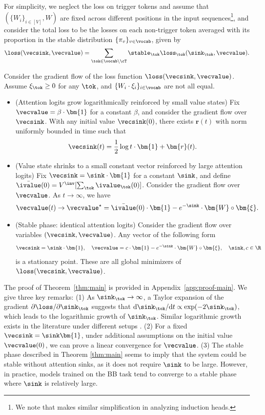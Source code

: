 For simplicity, we neglect the loss on trigger tokens and assume that $(\{ W_i \}_{i \in [V]}, W)$ are fixed across different positions in the input sequences\footnote{We note that \cite{reddy2023mechanistic} makes similar simplification in analyzing induction heads.}, and consider the total loss to be the losses on each non-trigger token averaged with its proportion in the stable distribution $\{\pi_v\}_{v \in \vocab}$, given by
\[
\loss(\vecsink,\vecvalue) = \sum_{\tok \in \vocab \setminus \cT} \stable_\tok \loss_\tok(\sink_\tok, \vecvalue).
\]
\begin{theorem}\label{thm:main}
Consider the gradient flow of the loss function $\loss(\vecsink, \vecvalue)$. Assume $\xi_\tok \ge 0$ for any $\tok$, and $\{ W_i \cdot \xi_i \}_{i \in \vocab}$ are not all equal. 
\begin{itemize}[leftmargin=2em]
\setlength\itemsep{0pt}
    \item (Attention logits grow logarithmically reinforced by small value states) Fix $\vecvalue= \beta \cdot \bm{1}$ for a constant $\beta$, and consider the gradient flow over $\vecsink$. With any initial value $\vecsink(0)$, there exists $\bm{r}(t)$ with norm uniformly bounded in time such that 
    \[\vecsink(t) = \frac{1}{2} \log t \cdot \bm{1} + \bm{r}(t).\]
    \item (Value state shrinks to a small constant vector reinforced by large attention logits) Fix $\vecsink = \sink \cdot \bm{1}$ for a constant $\sink$, and define $\bar{\ivalue}(0) = V^\inv[\sum_{\tok} \ivalue_\tok(0)]$. Consider the gradient flow over $\vecvalue$. As $t \to \infty$, we have
    \[\vecvalue(t) \to \vecvalue^\star = \bar\ivalue(0) \cdot \bm{1} - e^{-\sink} \cdot \bm{W}\circ \bm{\xi}.\]
    \item (Stable phase: identical attention logits) Consider the gradient flow over variables $(\vecsink, \vecvalue)$. Any vector of the following form
    \[\vecsink = \sink \cdot \bm{1}, \quad \vecvalue = c \cdot \bm{1} - e^{-\sink} \cdot \bm{W} \circ \bm{\xi},  ~~~ \sink, c\in\R \]
     is a stationary point. These are all global minimizers of $\loss(\vecsink,\vecvalue)$.
\end{itemize}
\end{theorem}
The proof of Theorem~\ref{thm:main} is provided in Appendix~\ref{app:proof-main}. We give three key remarks: (1) As $\sink_\tok\to\infty$, a Taylor expansion of the gradient $\partial \loss/\partial \sink_\tok$ suggests that $\mathrm{d}\sink_\tok/\mathrm{d}t \propto \exp(-2 \sink_\tok)$, which leads to the logarithmic growth of $\sink_\tok$. Similar logarithmic growth exists in the literature under different setups \citep{tian2023scan,han2023lm}. (2) For a fixed $\vecsink=\sink\bm{1}$, under additional assumptions on the initial value $\vecvalue(0)$, we can prove a linear convergence for $\vecvalue$. (3) The stable phase described in Theorem \ref{thm:main} seems to imply that the system could be stable without attention sinks, as it does not require $\sink$ to be large. However, in practice, models trained on the BB task tend to converge to a stable phase where $\sink$ is relatively large. 
